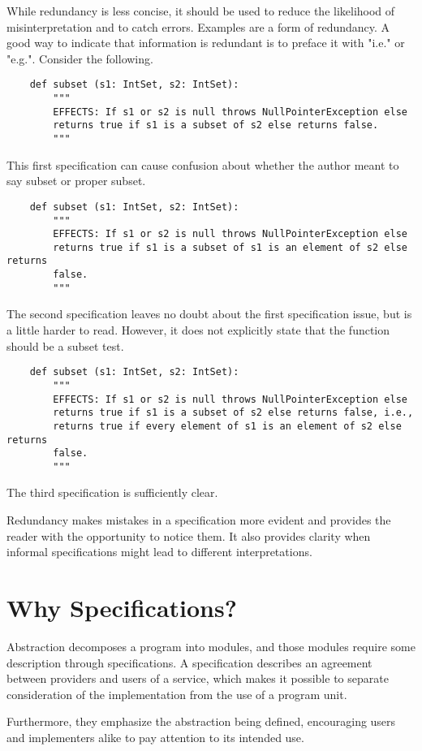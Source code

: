 \documentclass[oneside,11pt,dvipsnames]{book}
\begin{document}
While redundancy is less concise, it should be used to reduce the likelihood of misinterpretation and to catch errors. Examples are a form of redundancy. A good way to indicate that information is redundant is to preface it with "i.e." or "e.g.". Consider the following.
\begin{lstlisting}
    def subset (s1: IntSet, s2: IntSet):
        """
        EFFECTS: If s1 or s2 is null throws NullPointerException else
        returns true if s1 is a subset of s2 else returns false.
        """

\end{lstlisting}
This first specification can cause confusion about whether the author meant to say subset or proper subset. 
\begin{lstlisting}
    def subset (s1: IntSet, s2: IntSet):
        """
        EFFECTS: If s1 or s2 is null throws NullPointerException else
        returns true if s1 is a subset of s1 is an element of s2 else returns
        false.
        """
\end{lstlisting}
The second specification leaves no doubt about the first specification issue, but is a little harder to read. However, it does not explicitly state that the function should be a subset test.
\begin{lstlisting}
    def subset (s1: IntSet, s2: IntSet):
        """
        EFFECTS: If s1 or s2 is null throws NullPointerException else
        returns true if s1 is a subset of s2 else returns false, i.e.,
        returns true if every element of s1 is an element of s2 else returns
        false.
        """
\end{lstlisting}
The third specification is sufficiently clear.

Redundancy makes mistakes in a specification more evident and provides the reader with the opportunity to notice them. It also provides clarity when informal specifications might lead to different interpretations.

\section{Why Specifications?}
Abstraction decomposes a program into modules, and those modules require some description through specifications. A specification describes an agreement between providers and users of a service, which makes it possible to separate consideration of the implementation from the use of a program unit.

Furthermore, they emphasize the abstraction being defined, encouraging users and implementers alike to pay attention to its intended use.
\end{document}
